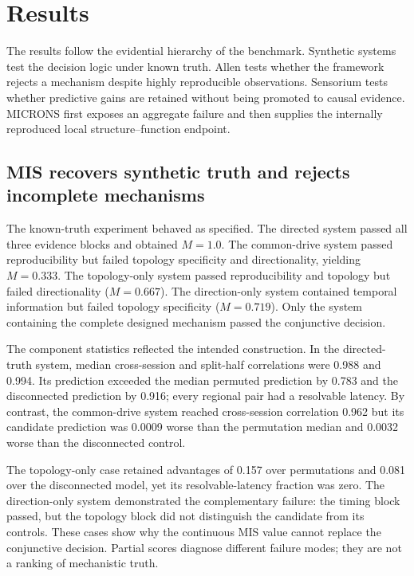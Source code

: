 \section{Results}
\label{sec:results}

The results follow the evidential hierarchy of the benchmark. Synthetic systems
test the decision logic under known truth. Allen tests whether the framework
rejects a mechanism despite highly reproducible observations. Sensorium tests
whether predictive gains are retained without being promoted to causal
evidence. MICRONS first exposes an aggregate failure and then supplies the
internally reproduced local structure--function endpoint.

\subsection{MIS recovers synthetic truth and rejects incomplete mechanisms}
\label{subsec:results-mis-synthetic}

The known-truth experiment behaved as specified. The directed system passed all
three evidence blocks and obtained $M=1.0$. The common-drive system passed
reproducibility but failed topology specificity and directionality, yielding
$M=0.333$. The topology-only system passed reproducibility and topology but
failed directionality ($M=0.667$). The direction-only system contained temporal
information but failed topology specificity ($M=0.719$). Only the system
containing the complete designed mechanism passed the conjunctive decision.

The component statistics reflected the intended construction. In the
directed-truth system, median cross-session and split-half correlations were
0.988 and 0.994. Its prediction exceeded the median permuted prediction by
0.783 and the disconnected prediction by 0.916; every regional pair had a
resolvable latency. By contrast, the common-drive system reached cross-session
correlation 0.962 but its candidate prediction was 0.0009 worse than the
permutation median and 0.0032 worse than the disconnected control.

The topology-only case retained advantages of 0.157 over permutations and 0.081
over the disconnected model, yet its resolvable-latency fraction was zero. The
direction-only system demonstrated the complementary failure: the timing block
passed, but the topology block did not distinguish the candidate from its
controls. These cases show why the continuous MIS value cannot replace the
conjunctive decision. Partial scores diagnose different failure modes; they are
not a ranking of mechanistic truth.

